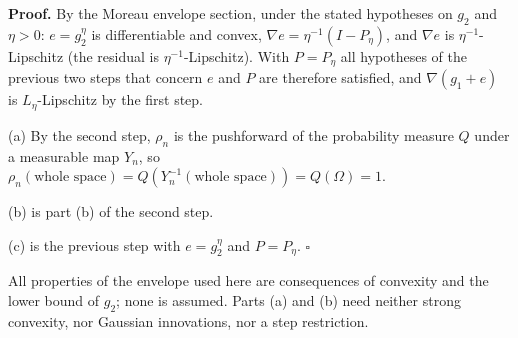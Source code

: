 \documentclass[11pt,a4paper]{report}
\begin{document}
\textbf{Proof.} By the Moreau envelope section, under the stated hypotheses on \(g_2\) and \(\eta>0\): \(e=g_2^\eta\) is differentiable and convex, \(\nabla e=\eta^{-1}(I-P_\eta)\), and \(\nabla e\) is \(\eta^{-1}\)-Lipschitz (the residual is \(\eta^{-1}\)-Lipschitz). With \(P=P_\eta\) all hypotheses of the previous two steps that concern \(e\) and \(P\) are therefore satisfied, and \(\nabla(g_1+e)\) is \(L_\eta\)-Lipschitz by the first step.




(a) By the second step, \(\rho_n\) is the pushforward of the probability measure \(Q\) under a measurable map \(Y_n\), so \(\rho_n(\text{whole space})=Q(Y_n^{-1}(\text{whole space}))=Q(\Omega)=1\).




(b) is part (b) of the second step.




(c) is the previous step with \(e=g_2^\eta\) and \(P=P_\eta\). \(\square\)




All properties of the envelope used here are consequences of convexity and the lower bound of \(g_2\); none is assumed. Parts (a) and (b) need neither strong convexity, nor Gaussian innovations, nor a step restriction.
\end{document}
